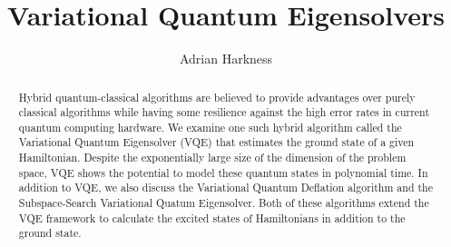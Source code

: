 \documentclass{article}
\title{Variational Quantum Eigensolvers}
\author{Adrian Harkness}
\begin{document}
\maketitle
\date{}

\begin{abstract}
Hybrid quantum-classical algorithms are believed to provide advantages over purely classical algorithms while having some resilience against the high error rates in current quantum computing hardware.  We examine one such hybrid algorithm called the Variational Quantum Eigensolver (VQE) that estimates the ground state of a given Hamiltonian.  Despite the exponentially large size of the dimension of the problem space, VQE shows the potential to model these quantum states in polynomial time.  In addition to VQE, we also discuss the Variational Quantum Deflation algorithm and the Subspace-Search Variational Quatum Eigensolver.  Both of these algorithms extend the VQE framework to calculate the excited states of Hamiltonians in addition to the ground state.  
\end{abstract}




\end{document}
